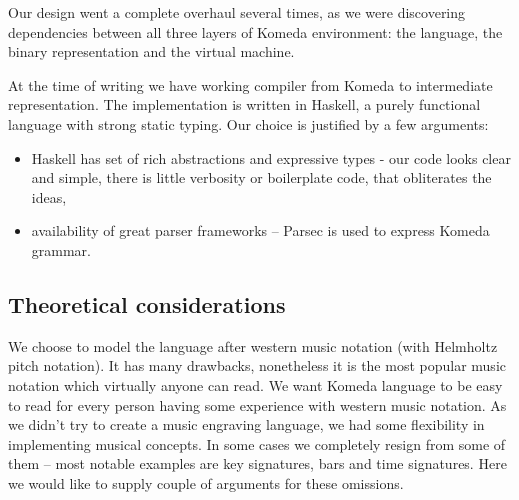 \documentclass{article}
\begin{document}
Our design went a complete overhaul several times, as we were discovering
dependencies between all three layers of Komeda environment: the language, the
binary representation and the virtual machine.

At the time of writing we have working compiler from Komeda to intermediate
representation. The implementation is written in Haskell, a purely functional
language with strong static typing. Our choice is justified by a few arguments:

\begin{itemize}
  \item Haskell \cite{haskell} has set of rich abstractions and expressive
    types - our code looks clear and simple, there is little verbosity or
    boilerplate code, that obliterates the ideas,
  \item availability of great parser frameworks -- Parsec \cite{parsec} is used
    to express Komeda grammar.
\end{itemize}

\subsection{Theoretical considerations}
\label{lang:theory}

We choose to model the language after western music notation (with Helmholtz
pitch notation).  It has many drawbacks, nonetheless it is the most popular
music notation which virtually anyone can read.  We want Komeda language to be
easy to read for every person having some experience with western music
notation.  As we didn't try to create a music engraving language, we had some
flexibility in implementing musical concepts. In some cases we completely
resign from some of them -- most notable examples are key signatures, bars and
time signatures.  Here we would like to supply couple of arguments for these
omissions.
\end{document}
